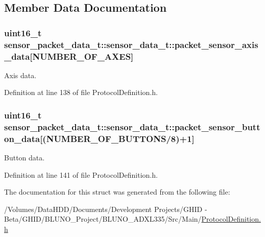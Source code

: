 \subsection{\-Member \-Data \-Documentation}
\hypertarget{structsensor__packet__data__t_1_1sensor__data__t_a755dff8cc9fcb35995098d8deb79fc9b}{
\subsubsection[{packet\-\_\-sensor\-\_\-axis\-\_\-data}]{\setlength{\rightskip}{0pt plus 5cm}uint16\-\_\-t {\bf sensor\-\_\-packet\-\_\-data\-\_\-t\-::sensor\-\_\-data\-\_\-t\-::packet\-\_\-sensor\-\_\-axis\-\_\-data}\mbox{[}{\bf \-N\-U\-M\-B\-E\-R\-\_\-\-O\-F\-\_\-\-A\-X\-E\-S}\mbox{]}}}\label{structsensor__packet__data__t_1_1sensor__data__t_a755dff8cc9fcb35995098d8deb79fc9b}


\-Axis data. 



\-Definition at line 138 of file \-Protocol\-Definition.\-h.

\hypertarget{structsensor__packet__data__t_1_1sensor__data__t_a6baa8757af57519544c5961b73bdad73}{
\subsubsection[{packet\-\_\-sensor\-\_\-button\-\_\-data}]{\setlength{\rightskip}{0pt plus 5cm}uint16\-\_\-t {\bf sensor\-\_\-packet\-\_\-data\-\_\-t\-::sensor\-\_\-data\-\_\-t\-::packet\-\_\-sensor\-\_\-button\-\_\-data}\mbox{[}({\bf \-N\-U\-M\-B\-E\-R\-\_\-\-O\-F\-\_\-\-B\-U\-T\-T\-O\-N\-S}/8)+1\mbox{]}}}\label{structsensor__packet__data__t_1_1sensor__data__t_a6baa8757af57519544c5961b73bdad73}


\-Button data. 



\-Definition at line 141 of file \-Protocol\-Definition.\-h.



\-The documentation for this struct was generated from the following file\-:\begin{DoxyCompactItemize}
\item 
/\-Volumes/\-Data\-H\-D\-D/\-Documents/\-Development Projects/\-G\-H\-I\-D -\/ Beta/\-G\-H\-I\-D/\-B\-L\-U\-N\-O\-\_\-\-Project/\-B\-L\-U\-N\-O\-\_\-\-A\-D\-X\-L335/\-Src/\-Main/\hyperlink{_protocol_definition_8h}{\-Protocol\-Definition.\-h}\end{DoxyCompactItemize}

